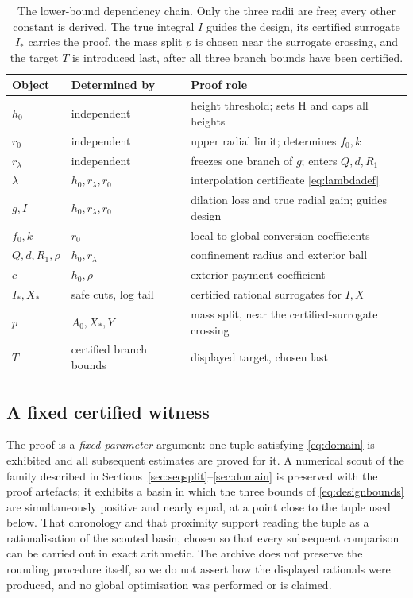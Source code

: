 \documentclass[11pt]{article}
\theoremstyle{plain}
\theoremstyle{definition}
\theoremstyle{remark}
\newcommand{\Istar}{I_{*}}
\begin{document}
\begin{table}[t]
\centering
\small
\begin{tabular}{@{}lll@{}}
\toprule
Object & Determined by & Proof role \\
\midrule
$h_{0}$ & independent & height threshold; sets $\mathrm{H}$ and caps all heights\\
$r_{0}$ & independent & upper radial limit; determines $f_{0},k$\\
$r_{\lambda}$ & independent & freezes one branch of $g$; enters $Q,d,R_{1}$\\
$\lambda$ & $h_{0},r_{\lambda},r_{0}$ & interpolation certificate \eqref{eq:lambdadef}\\
$g,I$ & $h_{0},r_{\lambda},r_{0}$ & dilation loss and true radial gain; guides
  design\\
$f_{0},k$ & $r_{0}$ & local-to-global conversion coefficients\\
$Q,d,R_{1},\rho$ & $h_{0},r_{\lambda}$ & confinement radius and exterior ball\\
$c$ & $h_{0},\rho$ & exterior payment coefficient\\
$\Istar,X_{*}$ & safe cuts, log tail & certified rational surrogates for $I,X$\\
$p$ & $A_{0},X_{*},Y$ & mass split, near the certified-surrogate crossing\\
$T$ & certified branch bounds & displayed target, chosen last\\
\bottomrule
\end{tabular}
\caption{The lower-bound dependency chain. Only the three radii are free; every
other constant is derived. The true integral $I$ guides the design, its
certified surrogate $\Istar$ carries the proof, the mass split $p$ is chosen
near the surrogate crossing, and the target $T$ is introduced last, after all
three branch bounds have been certified.}
\label{tab:depend}
\end{table}

\subsection{A fixed certified witness}

The proof is a \emph{fixed-parameter} argument: one tuple satisfying
\eqref{eq:domain} is exhibited and all subsequent estimates are proved for it.
A numerical scout of the family described in
Sections~\ref{sec:seqsplit}--\ref{sec:domain} is preserved with the proof
artefacts; it exhibits a basin in which the three bounds of
\eqref{eq:designbounds} are simultaneously positive and nearly equal, at a point
close to the tuple used below. That chronology and that proximity support
reading the tuple as a rationalisation of the scouted basin, chosen so that
every subsequent comparison can be carried out in exact arithmetic. The archive
does not preserve the rounding procedure itself, so we do not assert how the
displayed rationals were produced, and no global optimisation was performed or
is claimed.
\end{document}
